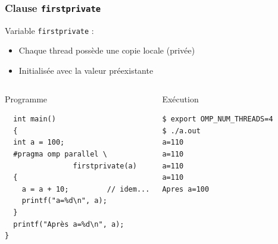 \documentclass{beamer}
\begin{document}
\begin{frame}[fragile]
  \frametitle{Clause {\tt firstprivate}}
  
   Variable {\tt firstprivate} :
  \begin{itemize}
  \item Chaque thread possède une copie locale (privée)
  \item Initialisée avec la valeur préexistante
  \end{itemize}
  
  \begin{columns}[t]
  \column{5cm}
\begin{block}{Programme}
\begin{verbatim}
  int main()
  {
  int a = 100;
  #pragma omp parallel \
                firstprivate(a)
  {
    a = a + 10;         // idem...
    printf("a=%d\n", a);
  }
  printf("Après a=%d\n", a);
}
\end{verbatim}
\end{block}
    
    
    \column{5cm}
\begin{block}{Exécution}    
  \small
\begin{verbatim}
$ export OMP_NUM_THREADS=4
$ ./a.out 
a=110
a=110
a=110
a=110
Apres a=100
\end{verbatim}
\end{block}    
  \end{columns}
\normalsize

\end{frame}
\end{document}
